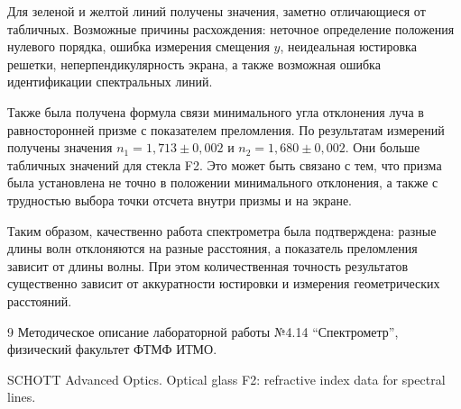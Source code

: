 \documentclass[a4paper,12pt]{article}
\begin{document}
Для зеленой и желтой линий получены значения, заметно отличающиеся от табличных. Возможные причины расхождения: неточное определение положения нулевого порядка, ошибка измерения смещения $y$, неидеальная юстировка решетки, неперпендикулярность экрана, а также возможная ошибка идентификации спектральных линий.

Также была получена формула связи минимального угла отклонения луча в равносторонней призме с показателем преломления. По результатам измерений получены значения $n_1=1{,}713\pm0{,}002$ и $n_2=1{,}680\pm0{,}002$. Они больше табличных значений для стекла F2. Это может быть связано с тем, что призма была установлена не точно в положении минимального отклонения, а также с трудностью выбора точки отсчета внутри призмы и на экране.

Таким образом, качественно работа спектрометра была подтверждена: разные длины волн отклоняются на разные расстояния, а показатель преломления зависит от длины волны. При этом количественная точность результатов существенно зависит от аккуратности юстировки и измерения геометрических расстояний.

\begin{thebibliography}{9}
Методическое описание лабораторной работы №4.14 ``Спектрометр'', физический факультет ФТМФ ИТМО.

SCHOTT Advanced Optics. Optical glass F2: refractive index data for spectral lines.
\end{thebibliography}
\end{document}
